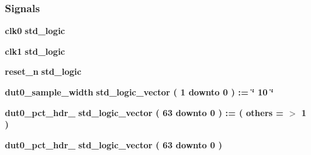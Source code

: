 \subsubsection*{Signals}
 \begin{DoxyCompactItemize}
\item 
{\bf clk0} {\bfseries \textcolor{comment}{std\+\_\+logic}\textcolor{vhdlchar}{ }} 
\item 
{\bf clk1} {\bfseries \textcolor{comment}{std\+\_\+logic}\textcolor{vhdlchar}{ }} 
\item 
{\bf reset\+\_\+n} {\bfseries \textcolor{comment}{std\+\_\+logic}\textcolor{vhdlchar}{ }} 
\item 
{\bf dut0\+\_\+sample\+\_\+width} {\bfseries \textcolor{comment}{std\+\_\+logic\+\_\+vector}\textcolor{vhdlchar}{ }\textcolor{vhdlchar}{(}\textcolor{vhdlchar}{ }\textcolor{vhdlchar}{ } \textcolor{vhdldigit}{1} \textcolor{vhdlchar}{ }\textcolor{keywordflow}{downto}\textcolor{vhdlchar}{ }\textcolor{vhdlchar}{ } \textcolor{vhdldigit}{0} \textcolor{vhdlchar}{ }\textcolor{vhdlchar}{)}\textcolor{vhdlchar}{ }\textcolor{vhdlchar}{ }\textcolor{vhdlchar}{ }\textcolor{vhdlchar}{\+:}\textcolor{vhdlchar}{=}\textcolor{vhdlchar}{ }\textcolor{vhdlchar}{ }\textcolor{vhdlchar}{ }\textcolor{vhdlchar}{ }\textcolor{keyword}{\char`\"{} 10 \char`\"{}}\textcolor{vhdlchar}{ }} 
\item 
{\bf dut0\+\_\+pct\+\_\+hdr\+\_} {\bfseries \textcolor{comment}{std\+\_\+logic\+\_\+vector}\textcolor{vhdlchar}{ }\textcolor{vhdlchar}{(}\textcolor{vhdlchar}{ }\textcolor{vhdlchar}{ } \textcolor{vhdldigit}{63} \textcolor{vhdlchar}{ }\textcolor{keywordflow}{downto}\textcolor{vhdlchar}{ }\textcolor{vhdlchar}{ } \textcolor{vhdldigit}{0} \textcolor{vhdlchar}{ }\textcolor{vhdlchar}{)}\textcolor{vhdlchar}{ }\textcolor{vhdlchar}{ }\textcolor{vhdlchar}{ }\textcolor{vhdlchar}{\+:}\textcolor{vhdlchar}{=}\textcolor{vhdlchar}{ }\textcolor{vhdlchar}{(}\textcolor{vhdlchar}{ }\textcolor{vhdlchar}{ }\textcolor{keywordflow}{others}\textcolor{vhdlchar}{ }\textcolor{vhdlchar}{ }\textcolor{vhdlchar}{=}\textcolor{vhdlchar}{ }\textcolor{vhdlchar}{$>$}\textcolor{vhdlchar}{ }\textcolor{vhdlchar}{\textquotesingle{}}\textcolor{vhdlchar}{ } \textcolor{vhdldigit}{1} \textcolor{vhdlchar}{ }\textcolor{vhdlchar}{\textquotesingle{}}\textcolor{vhdlchar}{ }\textcolor{vhdlchar}{)}\textcolor{vhdlchar}{ }} 
\item 
{\bf dut0\+\_\+pct\+\_\+hdr\+\_} {\bfseries \textcolor{comment}{std\+\_\+logic\+\_\+vector}\textcolor{vhdlchar}{ }\textcolor{vhdlchar}{(}\textcolor{vhdlchar}{ }\textcolor{vhdlchar}{ } \textcolor{vhdldigit}{63} \textcolor{vhdlchar}{ }\textcolor{keywordflow}{downto}\textcolor{vhdlchar}{ }\textcolor{vhdlchar}{ } \textcolor{vhdldigit}{0} \textcolor{vhdlchar}{ }\textcolor{vhdlchar}{)}\textcolor{vhdlchar}{ }} 

\end{DoxyCompactItemize}
